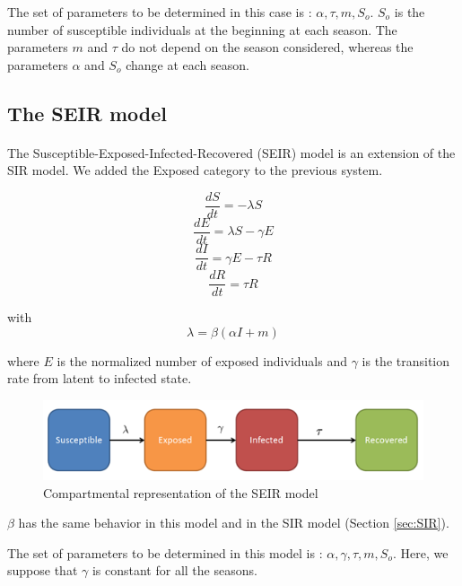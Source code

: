 \documentclass[11pt, a4paper]{article}
\begin{document}
The set of parameters to be determined in this case is : $ {\alpha, \tau, m, S_o}$. $S_o$ is the number of susceptible individuals at the beginning at each season. The parameters $m$ and $\tau$ do not depend on the season considered, whereas the parameters $\alpha$ and $S_o$ change at each season.

\subsection{The SEIR model}
\paragraph{}
The Susceptible-Exposed-Infected-Recovered (SEIR) model is an extension of the SIR model. We added the Exposed category to the previous system.

\begin{equation}
\frac{dS}{dt} = - \lambda S
\end{equation}
\begin{equation}
\frac{dE}{dt} = \lambda S - \gamma E
\end{equation}
\begin{equation}
\frac{dI}{dt} = \gamma E - \tau R
\end{equation}
\begin{equation}
\frac{dR}{dt} = \tau R
\end{equation}

with \[ \lambda = \beta (\alpha I + m) \]

where $E$ is the normalized number of exposed individuals and $\gamma$ is the transition rate from latent to infected state.

\begin{figure}[h]
\center
   \includegraphics[width = \textwidth]{picture2.png}
   \caption{Compartmental representation of the SEIR model}
   \label{SEIRcr}
\end{figure}

$\beta$ has the same behavior in this model and in the SIR model (Section \ref{sec:SIR}).

The set of parameters to be determined in this model is : $ { \alpha, \gamma, \tau, m, S_o}$. Here, we suppose that $\gamma$ is constant for all the seasons. 
\end{document}
